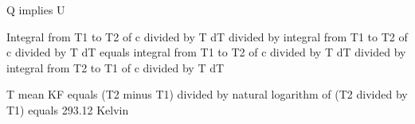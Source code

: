 Q implies U  

Integral from T1 to T2 of c divided by T dT divided by integral from T1 to T2 of c divided by T dT equals integral from T1 to T2 of c divided by T dT divided by integral from T2 to T1 of c divided by T dT  

T mean KF equals (T2 minus T1) divided by natural logarithm of (T2 divided by T1) equals 293.12 Kelvin